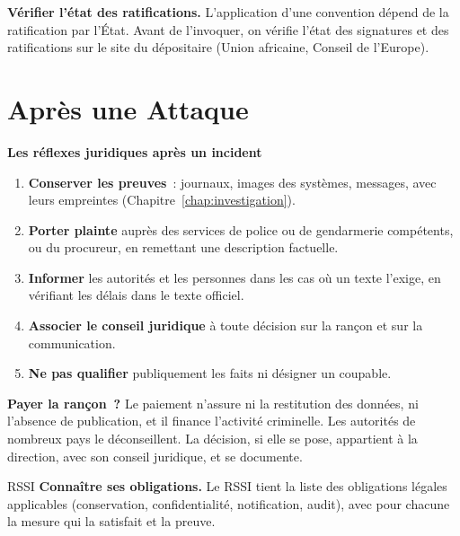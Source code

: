 \begin{boxinfo}
\textbf{Vérifier l'état des ratifications.} L'application d'une
convention dépend de la ratification par l'État. Avant de l'invoquer,
on vérifie l'état des signatures et des ratifications sur le site du
dépositaire (Union africaine, Conseil de l'Europe).
\end{boxinfo}

\section{Après une Attaque}
\label{sec:c11-apres}

\begin{boxprocedure}
\textbf{Les réflexes juridiques après un incident}
\begin{enumerate}
    \item \textbf{Conserver les preuves}~: journaux, images des systèmes,
          messages, avec leurs empreintes (Chapitre~\ref{chap:investigation}).
    \item \textbf{Porter plainte} auprès des services de police ou de
          gendarmerie compétents, ou du procureur, en remettant une
          description factuelle.
    \item \textbf{Informer} les autorités et les personnes dans les cas où
          un texte l'exige, en vérifiant les délais dans le texte officiel.
    \item \textbf{Associer le conseil juridique} à toute décision sur la
          rançon et sur la communication.
    \item \textbf{Ne pas qualifier} publiquement les faits ni désigner un
          coupable.
\end{enumerate}
\end{boxprocedure}

\begin{boxinfo}
\textbf{Payer la rançon~?} Le paiement n'assure ni la restitution des
données, ni l'absence de publication, et il finance l'activité
criminelle. Les autorités de nombreux pays le déconseillent. La décision,
si elle se pose, appartient à la direction, avec son conseil juridique,
et se documente.
\end{boxinfo}

\begin{boxmetier}{RSSI}
\textbf{Connaître ses obligations.} Le RSSI tient la liste des
obligations légales applicables (conservation, confidentialité,
notification, audit), avec pour chacune la mesure qui la satisfait et la
preuve.
\end{boxmetier}

